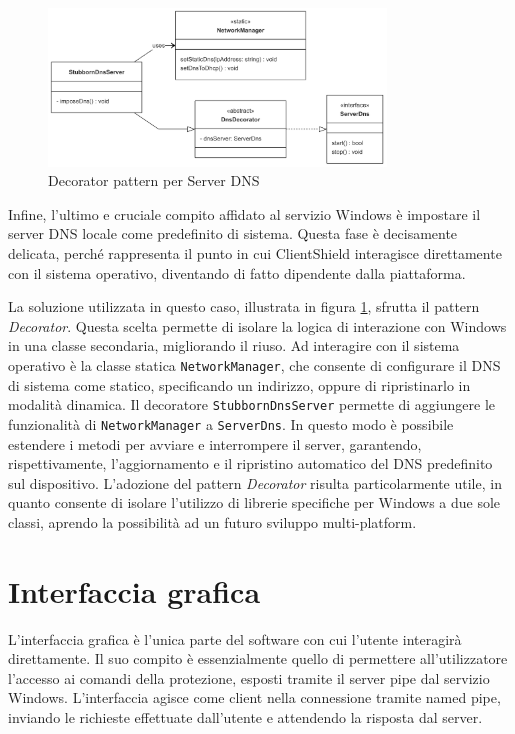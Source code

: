 \documentclass[12pt,a4paper,openright,twoside]{book}
\begin{document}
\begin{figure}[H]
	\centering
	\includegraphics[width=0.8\textwidth]{figures/dns-decorator-pattern.png}
	\caption{Decorator pattern per Server DNS}
	\label{fig:dns-decorator-pattern}
\end{figure}
Infine, l'ultimo e cruciale compito affidato al servizio Windows è impostare il server \gls{DNS} locale come predefinito di sistema.
Questa fase è decisamente delicata, perché rappresenta il punto in cui ClientShield interagisce direttamente con il sistema operativo, diventando di fatto dipendente dalla piattaforma.

La soluzione utilizzata in questo caso, illustrata in figura \ref{fig:dns-decorator-pattern}, sfrutta il pattern \textit{Decorator}.
Questa scelta permette di isolare la logica di interazione con Windows in una classe secondaria, migliorando il riuso.
Ad interagire con il sistema operativo è la classe statica \texttt{NetworkManager}, che consente di configurare il \gls{DNS} di sistema come statico, specificando un indirizzo, oppure di ripristinarlo in modalità dinamica.
Il decoratore \texttt{StubbornDnsServer} permette di aggiungere le funzionalità di \texttt{NetworkManager} a \texttt{ServerDns}.
In questo modo è possibile estendere i metodi per avviare e interrompere il server, garantendo, rispettivamente, l'aggiornamento e il ripristino automatico del \gls{DNS} predefinito sul dispositivo.
L'adozione del pattern \textit{Decorator} risulta particolarmente utile, in quanto consente di isolare l'utilizzo di librerie specifiche per Windows a due sole classi, aprendo la possibilità ad un futuro sviluppo multi-platform.

\section{Interfaccia grafica}

L'interfaccia grafica è l'unica parte del software con cui l'utente interagirà direttamente.
Il suo compito è essenzialmente quello di permettere all'utilizzatore l'accesso ai comandi della protezione, esposti tramite il server pipe dal servizio Windows.
L'interfaccia agisce come client nella connessione tramite named pipe, inviando le richieste effettuate dall'utente e attendendo la risposta dal server.
\end{document}
